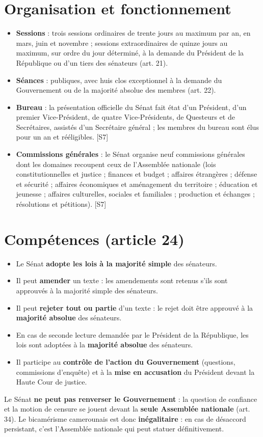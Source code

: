 \documentclass[11pt,a4paper,oneside]{report}
\newcommand{\src}[1]{\textcolor{bluec}{\scriptsize[#1]}}
\begin{document}
\section{Organisation et fonctionnement}
\begin{itemize}
  \item \textbf{Sessions} : trois sessions ordinaires de trente jours au maximum par an, en mars, juin et novembre ; sessions extraordinaires de quinze jours au maximum, sur ordre du jour déterminé, à la demande du Président de la République ou d'un tiers des sénateurs (art. 21).
  \item \textbf{Séances} : publiques, avec huis clos exceptionnel à la demande du Gouvernement ou de la majorité absolue des membres (art. 22).
  \item \textbf{Bureau} : la présentation officielle du Sénat fait état d'un Président, d'un premier Vice-Président, de quatre Vice-Présidents, de Questeurs et de Secrétaires, assistés d'un Secrétaire général ; les membres du bureau sont élus pour un an et rééligibles. \src{S7}
  \item \textbf{Commissions générales} : le Sénat organise neuf commissions générales dont les domaines recoupent ceux de l'Assemblée nationale (lois constitutionnelles et justice ; finances et budget ; affaires étrangères ; défense et sécurité ; affaires économiques et aménagement du territoire ; éducation et jeunesse ; affaires culturelles, sociales et familiales ; production et échanges ; résolutions et pétitions). \src{S7}
\end{itemize}
\section{Compétences (article 24)}
\begin{itemize}
  \item Le Sénat \textbf{adopte les lois à la majorité simple} des sénateurs.
  \item Il peut \textbf{amender} un texte : les amendements sont retenus s'ils sont approuvés à la majorité simple des sénateurs.
  \item Il peut \textbf{rejeter tout ou partie} d'un texte : le rejet doit être approuvé à la \textbf{majorité absolue} des sénateurs.
  \item En cas de seconde lecture demandée par le Président de la République, les lois sont adoptées à la \textbf{majorité absolue} des sénateurs.
  \item Il participe au \textbf{contrôle de l'action du Gouvernement} (questions, commissions d'enquête) et à la \textbf{mise en accusation} du Président devant la Haute Cour de justice.
\end{itemize}
\begin{warnbox}[title={Point de vigilance — Ce que le Sénat ne fait pas}]
Le Sénat \textbf{ne peut pas renverser le Gouvernement} : la question de confiance et la motion de censure se jouent devant la \textbf{seule Assemblée nationale} (art. 34). Le bicamérisme camerounais est donc \textbf{inégalitaire} : en cas de désaccord persistant, c'est l'Assemblée nationale qui peut statuer définitivement.
\end{warnbox}
\end{document}
